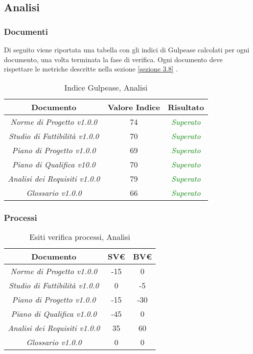 \subsection{Analisi}
\label{verifica}
\subsubsection{Documenti}
\label{appendice 1}

Di seguito viene riportata una tabella con gli indici di Gulpease calcolati per ogni documento, una volta terminata la fase di verifica. Ogni documento deve rispettare le metriche descritte nella sezione \ref{sezione 3.8} .\\

\hspace{1cm}

\begin{table}[h]
	\begin{tabular}{|c|c|c|}
		\hline 
		\textbf{Documento} & \textbf{Valore Indice} & \textbf{Risultato} \\ 
		\hline
		\textit{Norme di Progetto v1.0.0} & 74 & \textcolor{green}{\textit{Superato}} \\ 
		\textit{Studio di Fattibilità v1.0.0} & 70 & \textcolor{green}{\textit{Superato}} \\ 
		\textit{Piano di Progetto v1.0.0} & 69 & \textcolor{green}{\textit{Superato}} \\ 
		\textit{Piano di Qualifica v10.0} & 70 & \textcolor{green}{\textit{Superato}} \\ 
		\textit{Analisi dei Requisiti v1.0.0} & 79 & \textcolor{green}{\textit{Superato}} \\ 
		\textit{Glossario v1.0.0} & 66 & \textcolor{green}{\textit{Superato}} \\ 
		\hline 
	\end{tabular}
\caption{Indice Gulpease, Analisi}
\end{table}


\subsubsection{Processi}
\label{appendice 2}
\vspace{3mm}

\begin{table}[h]
	\begin{tabular}{|c|c|c|}
		\toprule
			\textbf{Documento} & \textbf{SV\euro} & \textbf{BV\euro} \\ 
		\midrule
		\midrule
			\textit{Norme di Progetto v1.0.0} & -15 & 0 \\ 
			\textit{Studio di Fattibilità v1.0.0} & 0 & -5 \\ 
			\textit{Piano di Progetto v1.0.0} & -15 & -30 \\ 
			\textit{Piano di Qualifica v1.0.0} & -45 & 0 \\ 
			\textit{Analisi dei Requisiti v1.0.0} & 35 & 60 \\ 
			\textit{Glossario v1.0.0} & 0 & 0 \\ 
		\bottomrule
	\end{tabular}
	\caption{Esiti verifica processi, Analisi}
\end{table}

